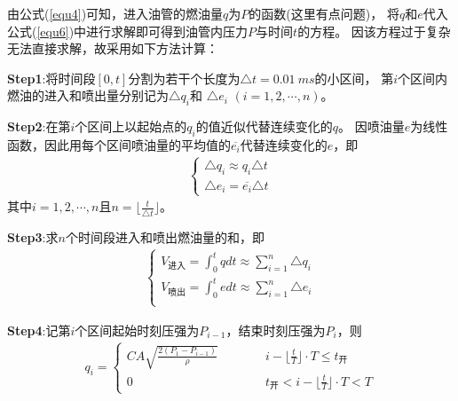 \documentclass[withoutpreface,bwprint]{cumcmthesis} %
\begin{document}
    由公式(\ref{equ4})可知，进入油管的燃油量$q$为$P$的函数({\color{red}这里有点问题})，
    将$q$和$e$代入公式(\ref{equ6})中进行求解即可得到油管内压力$P$与时间$t$的方程。
    因该方程过于复杂无法直接求解，故采用如下方法计算：
    
    \textbf{Step1}:将时间段$[0,t]$分割为若干个长度为$\triangle t=0.01~ms$的小区间，
    第$i$个区间内燃油的进入和喷出量分别记为$\triangle q_i$和 $\triangle e_i$
    $(i=1,2,\cdots,n)$。

    \textbf{Step2}:在第$i$个区间上以起始点的$q_i$的值近似代替连续变化的$q$。
    因喷油量$e$为线性函数，因此用每个区间喷油量的平均值的$\overline{e_i}$代替连续变化的$e$，即
    \begin{eqnarray}
        \begin{cases}
            \triangle q_i \approx q_i\triangle t\\
            \triangle e_i = \overline{e_i}\triangle t
        \end{cases}
    \label{equ8}
    \end{eqnarray}
    其中$i=1,2,\cdots,n$且$n=\lfloor{\frac{t}{\triangle t}}\rfloor$。
    
    \textbf{Step3}:求$n$个时间段进入和喷出燃油量的和，即
    \begin{eqnarray}
        \begin{cases}
            V_{\text{进入}}=\int_0^t q dt \approx
             \sum\limits_{i=1}^n \triangle q_i \\
            V_{\text{喷出}}=\int_0^t e dt \approx
             \sum\limits_{i=1}^n \triangle e_i \\
        \end{cases}
    \label{equ9}
    \end{eqnarray}

    \textbf{Step4}:记第$i$个区间起始时刻压强为$P_{i-1}$，结束时刻压强为$P_i$，则
    \begin{eqnarray}
        q_i=
        \begin{cases}
        CA\sqrt{\frac{2(P_1-P_{i-1})}{\rho}} \quad \quad  \quad
        & i-\lfloor{\frac{t}{T}}\rfloor \cdot T \leq t_{\text{开}}\\
        0 & t_{\text{开}} < i-\lfloor{\frac{t}{T}}\rfloor \cdot T < T
        \end{cases}
    \label{equ10}
    \end{eqnarray}
\end{document}
